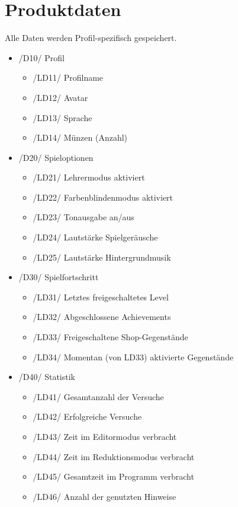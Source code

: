 \section{Produktdaten}

Alle Daten werden Profil-spezifisch gespeichert.

\begin{itemize}

\item /D10/ Profil
\begin{itemize}
\item /LD11/ Profilname
\item /LD12/ Avatar
\item /LD13/ Sprache
\item /LD14/ Münzen (Anzahl)
\end{itemize}

\item /D20/ Spieloptionen
\begin{itemize}
\item /LD21/ Lehrermodus aktiviert
\item /LD22/ Farbenblindenmodus aktiviert
\item /LD23/ Tonausgabe an/aus
\item /LD24/ Lautstärke Spielgeräusche
\item /LD25/ Lautstärke Hintergrundmusik
\end{itemize}

\item /D30/ Spielfortschritt
\begin{itemize}
\item /LD31/ Letztes freigeschaltetes Level
\item /LD32/ Abgeschlossene Achievements
\item /LD33/ Freigeschaltene Shop-Gegenstände
\item /LD34/ Momentan (von LD33) aktivierte Gegenstände
\end{itemize}

\item /D40/ Statistik
\begin{itemize}
\item /LD41/ Gesamtanzahl der Versuche
\item /LD42/ Erfolgreiche Versuche
\item /LD43/ Zeit im Editormodus verbracht
\item /LD44/ Zeit im Reduktionsmodus verbracht
\item /LD45/ Gesamtzeit im Programm verbracht
\item /LD46/ Anzahl der genutzten Hinweise
\end{itemize}

\end{itemize}
